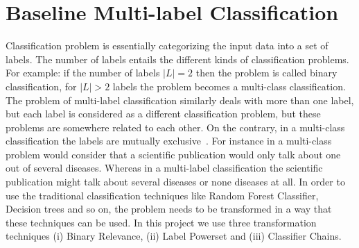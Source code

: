
\section{Baseline Multi-label Classification}\label{MLtranform}
Classification problem is essentially categorizing the input data into a set of labels. The number of labels entails the different kinds of classification problems. For example: if the number of labels $|L| = 2$ then the problem is called binary classification, for $|L| > 2$ labels the problem becomes a multi-class classification. The problem of multi-label classification similarly deals with more than one label, but each label is considered as a different classification problem, but these problems are somewhere related to each other. On the contrary, in a multi-class classification the labels are mutually exclusive~\cite{tsoumakas2007multi}. For instance in a multi-class problem would consider that a scientific publication would only talk about one out of several diseases. Whereas in a multi-label classification the scientific publication might talk about several diseases or none diseases at all. 
In order to use the traditional classification techniques like Random Forest Classifier, Decision trees and so on, the problem needs to be transformed in a way that these techniques can be used. In this project we use three transformation techniques (i) Binary Relevance, (ii) Label Powerset and (iii) Classifier Chains. 
